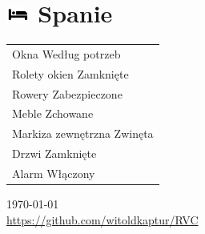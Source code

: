 \documentclass{article}
\begin{document}
\begin{multicols}{2}
\begin{tabularx}{\columnwidth}{|X|}
\hline
\end{tabularx}

\section*{\includegraphics[height=5mm]{bed.png} Spanie}
\begin{tabularx}{\columnwidth}{|X|}
\hline
Okna \dotfill Według potrzeb \\
Rolety okien \dotfill Zamknięte \\
Rowery \dotfill Zabezpieczone \\
Meble \dotfill Zchowane \\
Markiza zewnętrzna \dotfill Zwinęta \\
Drzwi \dotfill Zamknięte \\
Alarm \dotfill Włączony \\
\hline
\end{tabularx}

\end{multicols}

\begin{center}
    \today  \\
    \url{https://github.com/witoldkaptur/RVC}
\end{center}
\end{document}
